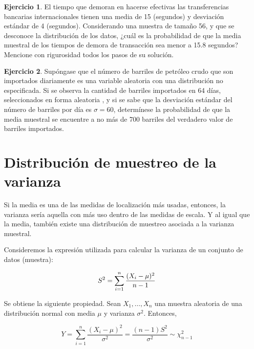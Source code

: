 \documentclass[
  11pt,
]{book}
\theoremstyle{definition}
\theoremstyle{definition}
\theoremstyle{definition}
\newtheorem{exercise}{Ejercicio}[chapter]
\theoremstyle{definition}
\theoremstyle{remark}
\begin{document}
\begin{exercise}
El tiempo que demoran en hacerse efectivas las transferencias bancarias internacionales tienen una media de 15 (segundos) y desviación estándar de 4 (segundos). Considerando una muestra de tamaño 56, y que se desconoce la distribución de los datos, ¿cuál es la probabilidad de que la media muestral de los tiempos de demora de transacción sea menor a 15.8 segundos? Mencione con rigurosidad todos los pasos de su solución.
\end{exercise}

\begin{exercise}
Supóngase que el número de barriles de petróleo crudo que son importados diariamente es una variable aleatoria con una distribución no especificada. Si se observa la cantidad de barriles importados en 64 días, seleccionados en forma aleatoria , y si se sabe que la desviación estándar del número de barriles por día es \(\sigma = 60\), determínese la probabilidad de que la media muestral se encuentre a no más de 700 barriles del verdadero valor de barriles importados.
\end{exercise}

\section{Distribución de muestreo de la varianza}\label{distribucionesmuestrales-varianza}

Si la media es una de las medidas de localización más usadas, entonces, la varianza sería aquella con más uso dentro de las medidas de escala. Y al igual que la media, también existe una distribución de muestreo asociada a la varianza muestral.

Consideremos la expresión utilizada para calcular la varianza de un conjunto de datos (muestra):

\begin{equation}
\notag
S^2 = \sum_{i=1}^n\frac{(X_i-\mu)^2}{n-1}
\end{equation}

Se obtiene la siguiente propiedad. Sean \(X_1,\ldots,X_n\) una muestra aleatoria de una distribución normal con media \(\mu\) y varianza \(\sigma^2\). Entonces,

\begin{equation}
Y=\sum_{i=1}^n\frac{(X_i-\mu)^2}{\sigma^2} = \frac{(n-1)S^2}{\sigma^2} \sim \chi^2_{n-1}
\label{eq:distVar}
\end{equation}
\end{document}
